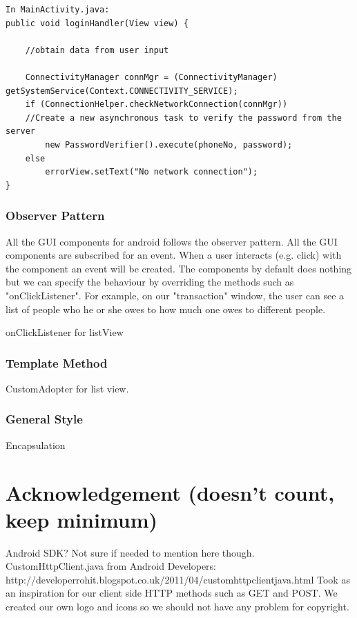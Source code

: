 \documentclass[a4paper,11pt]{article}
\begin{document}
 \begin{verbatim}
In MainActivity.java:
public void loginHandler(View view) {

	//obtain data from user input

	ConnectivityManager connMgr = (ConnectivityManager) getSystemService(Context.CONNECTIVITY_SERVICE);
	if (ConnectionHelper.checkNetworkConnection(connMgr))
	//Create a new asynchronous task to verify the password from the server
		new PasswordVerifier().execute(phoneNo, password);
	else
		errorView.setText("No network connection");
}
 \end{verbatim}
 
\subsubsection*{Observer Pattern}

All the GUI components for android follows the observer pattern. All the GUI components are subscribed for an event. When a user interacts (e.g. click) with the component an event will be created. The components by default does nothing but we can specify the behaviour by overriding the methods such as "onClickListener". For example, on our "transaction" window, the user can see a list of people who he or she owes to how much one owes to different people.  

onClickListener for listView 
 
\subsubsection*{Template Method}
CustomAdopter for list view.

\subsubsection*{General Style}
Encapsulation

 
\section{Acknowledgement (doesn’t count, keep minimum)}
Android SDK? Not sure if needed to mention here though.
CustomHttpClient.java from Android Developers: http://developerrohit.blogspot.co.uk/2011/04/customhttpclientjava.html
Took as an inspiration for our client side HTTP methods such as GET and POST.
We created our own logo and icons so we should not have any problem for copyright. 
\end{document}

